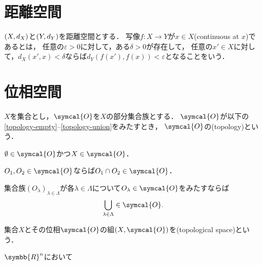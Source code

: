 \documentclass{ltjsbook}
\begin{document}
\nocite{uchida}
\nocite{introduction-to-topology}

\section{距離空間}
\begin{thmbox}
\begin{definition}
\((X, d_{X})\)と\((Y, d_{Y})\)を距離空間とする．
写像\(f\colon X \to Y\)が\(x \in X\)(continuous at \(x\))であるとは，
任意の\(\varepsilon > 0\)に対して，ある\(\delta > 0\)が存在して，
任意の\(x' \in X\)に対して，\(d_{X}(x', x) < \delta\)ならば\(d_{Y}(f(x'), f(x)) < \varepsilon\)となることをいう．
\end{definition}
\end{thmbox}

\section{位相空間}
\begin{thmbox}
\begin{definition}
\(X\)を集合とし，\(\symcal{O}\)を\(X\)の部分集合族とする．
\(\symcal{O}\)が以下の\ref{topology-empty}--\ref{topology-union}をみたすとき，
\(\symcal{O}\)の(topology)という．
\begin{conditions}
    \item\label{topology-empty} \(\emptyset \in \symcal{O}\)かつ\(X \in \symcal{O}\)．
    \item\label{topology-intersection} \(O_1, O_2 \in \symcal{O}\)ならば\(O_1 \cap O_2 \in \symcal{O}\)．
    \item\label{topology-union} 集合族\({(O_\lambda)}_{\lambda \in \Lambda}\)が各\(\lambda \in \Lambda\)について\(O_\lambda \in \symcal{O}\)をみたすならば
        \begin{align}
            \bigcup_{\lambda \in \Lambda} \in \symcal{O}.
        \end{align}
\end{conditions}
集合\(X\)とその位相\(\symcal{O}\)の組\((X, \symcal{O})\)を(topological space)という．
\end{definition}
\end{thmbox}

\begin{thmbox}
\begin{definition}
\(\symbb{R}^n\)において
\end{definition}
\end{thmbox}
\end{document}

